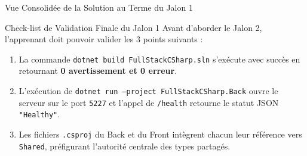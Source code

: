 \begin{schemabox}{Vue Consolidée de la Solution au Terme du Jalon 1}
\begin{center}
\end{center}
\end{schemabox}

\vspace{0.2cm}

\begin{bestpracticebox}{Check-list de Validation Finale du Jalon 1}
Avant d'aborder le Jalon 2, l'apprenant doit pouvoir valider les 3 points suivants :
\begin{enumerate}
    \item La commande \texttt{dotnet build FullStackCSharp.sln} s'exécute avec succès en retournant \textbf{0 avertissement et 0 erreur}.
    \item L'exécution de \texttt{dotnet run --project FullStackCSharp.Back} ouvre le serveur sur le port \texttt{5227} et l'appel de \texttt{/health} retourne le statut JSON \texttt{"Healthy"}.
    \item Les fichiers \texttt{.csproj} du Back et du Front intègrent chacun leur référence vers \texttt{Shared}, préfigurant l'autorité centrale des types partagés.
\end{enumerate}
\end{bestpracticebox}
